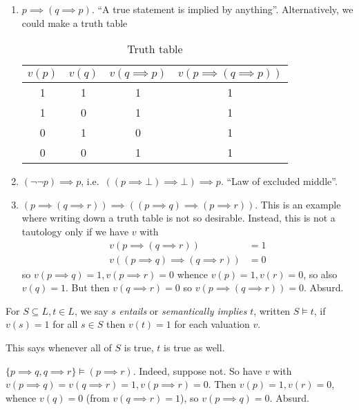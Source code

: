 \documentclass[a4paper]{article}
\begin{document}
\begin{eg}\leavevmode
  \begin{enumerate}
  \item \(p \implies (q \implies p)\). ``A true statement is implied by anything''. Alternatively, we could make a truth table
    \begin{table}[h]
      \centering
      \begin{tabular}{c|c|c|c}
        \(v(p)\) & \(v(q)\) & \(v(q \implies p)\) & \(v(p \implies (q \implies p))\) \\\hline
        1 & 1 & 1 & 1 \\
        1 & 0 & 1 & 1 \\
        0 & 1 & 0 & 1 \\
        0 & 0 & 1 & 1
      \end{tabular}
      \caption{Truth table}
    \end{table}
  \item \((\neg \neg p) \implies p\), i.e.\ \(((p \implies \bot) \implies \bot) \implies p\). ``Law of excluded middle''.
  \item \((p \implies (q \implies r)) \implies ((p \implies q) \implies (p \implies r))\). This is an example where writing down a truth table is not so desirable. Instead, this is not a tautology only if we have \(v\) with
    \begin{align*}
      v(p \implies (q\implies r)) &= 1 \\
      v((p \implies q) \implies (q \implies r)) &= 0
    \end{align*}
    so \(v(p \implies q) = 1, v(p \implies r) = 0\) whence \(v(p) = 1, v(r) = 0\), so also \(v(q) = 1\). But then \(v(q \implies r) = 0\) so \(v(p \implies (q \implies r)) = 0\). Absurd.
  \end{enumerate}
\end{eg}

\begin{definition}[Entailment]
  For \(S \subseteq L, t \in L\), we say \(s\) \emph{entails} or \emph{semantically implies} \(t\), written \(S \models t\), if \(v(s) = 1\) for all \(s \in S\) then \(v(t) = 1\) for each valuation \(v\).
\end{definition}

This says whenever all of \(S\) is true, \(t\) is true as well.

\begin{eg}
  \(\{p \implies q, q \implies r\} \models (p \implies r)\). Indeed, suppose not. So have \(v\) with \(v(p \implies q) = v(q \implies r) = 1, v(p \implies r) = 0\). Then \(v(p) = 1, v(r) = 0\), whence \(v(q) = 0\) (from \(v(q \implies r) = 1\)), so \(v(p \implies q) = 0\). Absurd.
\end{eg}
\end{document}

